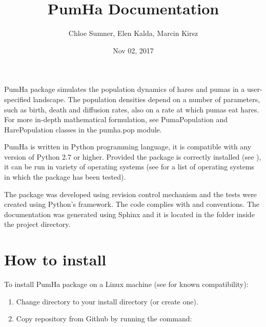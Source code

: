 \documentclass[letterpaper,10pt,english]{sphinxmanual}
\title{PumHa Documentation}
\date{Nov 02, 2017}
\author{Chloe Sumner, Elen Kalda, Marcin Kirsz}
\begin{document}
\maketitle
\sphinxtableofcontents
{}\label{\detokenize{index::doc}}


PumHa package simulates the population dynamics of hares and pumas in a user-specified landscape. The population densities depend on a number of parameters, such as birth, death and diffusion rates, also on a rate at which pumas eat hares. For more in-depth mathematical formulation, see PumaPopulation and HarePopulation classes in the pumha.pop module.

PumHa is written in Python programming language, it is compatible with any version of Python 2.7 or higher. Provided the package is correctly installed (see {\hyperref[\detokenize{index:how-to-install}]{}}), it can be run in variety of operating systems (see {\hyperref[\detokenize{index:system-compatibility-and-requirements}]{}} for a list of operating systems in which the package has been tested).

The package was developed using  revision control mechanism and the tests were created using Python’s  framework. The code complies with  and  conventions. The documentation was generated using Sphinx and it is located in the  folder inside the project directory.


\chapter{How to install}
\label{\detokenize{index:welcome-to-pumha-s-documentation}}\label{\detokenize{index:how-to-install}}\label{\detokenize{index:nose}}
To install PumHa package on a Linux machine (see {\hyperref[\detokenize{index:system-compatibility-and-requirements}]{}} for known compatibility):
\begin{enumerate}
\item {} 
Change directory to your install directory (or create one).

\item {} 
Copy repository from Github by running the command:

\begin{sphinxVerbatim}[commandchars=\\\{\}]
  
\end{sphinxVerbatim}

\end{enumerate}
\end{document}
